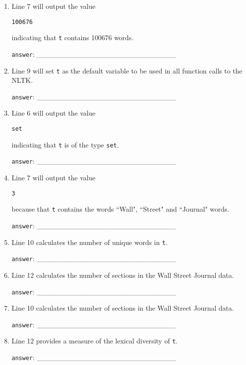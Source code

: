 \documentclass[a4paper,11pt]{scrartcl}
\begin{document}
\begin{enumerate}[label=\alph*)]
\item Line 7 will output the value
\begin{verbatim}
100676
\end{verbatim}
indicating that \verb|t| contains 100676 words.

\verb|answer|: \_\_\_\_\_\_\_\_\_\_\_\_\_\_\_\_\_\_\_\_\_\_\_\_\_\_\_

\item Line 9 will set \verb|t| as the default variable to be used
in all function calls to the NLTK.

\verb|answer|: \_\_\_\_\_\_\_\_\_\_\_\_\_\_\_\_\_\_\_\_\_\_\_\_\_\_\_

\item Line 6 will output the value
\begin{verbatim}
set
\end{verbatim}
indicating that \verb|t| is of the type \verb|set|.

\verb|answer|: \_\_\_\_\_\_\_\_\_\_\_\_\_\_\_\_\_\_\_\_\_\_\_\_\_\_\_

\item Line 7 will output the value
\begin{verbatim}
3
\end{verbatim}
because that \verb|t| contains the words ``Wall", ``Street" and
``Journal" words.

\verb|answer|: \_\_\_\_\_\_\_\_\_\_\_\_\_\_\_\_\_\_\_\_\_\_\_\_\_\_\_

\item Line 10 calculates the number of unique words in \verb|t|.

\verb|answer|: \_\_\_\_\_\_\_\_\_\_\_\_\_\_\_\_\_\_\_\_\_\_\_\_\_\_\_

\item Line 12 calculates the number of sections in the Wall Street Journal data.

\verb|answer|: \_\_\_\_\_\_\_\_\_\_\_\_\_\_\_\_\_\_\_\_\_\_\_\_\_\_\_

\item Line 10 calculates the number of sections in the Wall Street Journal data.

\verb|answer|: \_\_\_\_\_\_\_\_\_\_\_\_\_\_\_\_\_\_\_\_\_\_\_\_\_\_\_

\item Line 12 provides a measure of the lexical diversity of \verb|t|.

\verb|answer|: \_\_\_\_\_\_\_\_\_\_\_\_\_\_\_\_\_\_\_\_\_\_\_\_\_\_\_


\end{enumerate}
\end{document}
